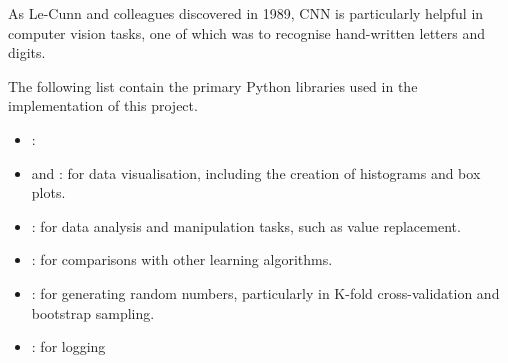 \documentclass[12pt]{article}
\begin{document}
As Le-Cunn and colleagues discovered in 1989, CNN is particularly helpful in computer vision tasks, one of which was to recognise hand-written letters and digits.




\newpage




\printbibliography


The following list contain the primary Python libraries used in the implementation of this project.

\vspace{-6pt}

\begin{itemize}
\setlength\itemsep{-0.3em}
  \item {} : 
  \item {} and  : for data visualisation, including the creation of histograms and box plots.
  \item {} : for data analysis and manipulation tasks, such as value replacement.
  \item {} : for comparisons with other learning algorithms.
  \item {} : for generating random numbers, particularly in K-fold cross-validation and bootstrap sampling.
  \item {} : for logging
\end{itemize}
\end{document}
